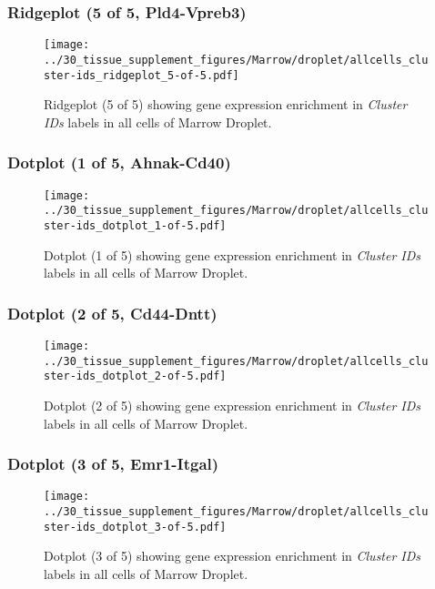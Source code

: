 \clearpage

\subsubsection{Ridgeplot (5 of 5, Pld4-Vpreb3)}
\begin{figure}[h]
\centering
\texttt{[image: ../30\_tissue\_supplement\_figures/Marrow/droplet/allcells\_cluster-ids\_ridgeplot\_5-of-5.pdf]}

\caption{ Ridgeplot (5 of 5)  showing gene expression enrichment in \emph{Cluster IDs} labels in all cells of Marrow Droplet. }
\end{figure}


\clearpage

\subsubsection{Dotplot (1 of 5, Ahnak-Cd40)}
\begin{figure}[h]
\centering
\texttt{[image: ../30\_tissue\_supplement\_figures/Marrow/droplet/allcells\_cluster-ids\_dotplot\_1-of-5.pdf]}

\caption{ Dotplot (1 of 5)  showing gene expression enrichment in \emph{Cluster IDs} labels in all cells of Marrow Droplet. }
\end{figure}


\clearpage

\subsubsection{Dotplot (2 of 5, Cd44-Dntt)}
\begin{figure}[h]
\centering
\texttt{[image: ../30\_tissue\_supplement\_figures/Marrow/droplet/allcells\_cluster-ids\_dotplot\_2-of-5.pdf]}

\caption{ Dotplot (2 of 5)  showing gene expression enrichment in \emph{Cluster IDs} labels in all cells of Marrow Droplet. }
\end{figure}


\clearpage

\subsubsection{Dotplot (3 of 5, Emr1-Itgal)}
\begin{figure}[h]
\centering
\texttt{[image: ../30\_tissue\_supplement\_figures/Marrow/droplet/allcells\_cluster-ids\_dotplot\_3-of-5.pdf]}

\caption{ Dotplot (3 of 5)  showing gene expression enrichment in \emph{Cluster IDs} labels in all cells of Marrow Droplet. }
\end{figure}


